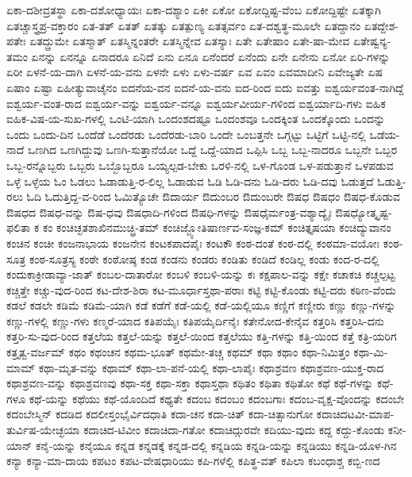 {ಏಕಾ-ದಶೀವ್ರತಸ್ಥಾ
ಏಕಾ-ದಶೋಧ್ಯಾಯಃ
ಏಕಾ-ದಶ್ಯಾಂ
ಏಕೀ
ಏಕೋ
ಏಕೋದ್ದಿಷ್ಟ-ವೆಂಬ
ಏಕೋದ್ದಿಷ್ಟೇ
ಏತಕ್ಕಾಗಿ
ಏತಚ್ಚಾಸ್ತ್ರಪ್ರ-ವಕ್ತಾರಂ
ಏತ-ತತ್
ಏತತ್
ಏತತ್ಕು
ಏತತ್ಪುಣ್ಯ
ಏತತ್ಸರ್ವಂ
ಏತ-ದಶ್ವತ್ಥ-ಮೂಲೇ
ಏತದ್ದಾನಂ
ಏತದ್ದೇಶ-ಪತೇಃ
ಏತದ್ದ್ರುಮೇ
ಏತಸ್ಮಾತ್
ಏತಸ್ಮಿನ್ನಂತರೇ
ಏತಸ್ಮಿನ್ನೇವ
ಏತಸ್ಯಾಃ
ಏತೇ
ಏತೇಷಾಂ
ಏತೇ-ಷಾ-ಮೇವ
ಏತೇಷ್ವನ್ಯ-ತಮಂ
ಏನನ್ನು
ಏನನ್ನೂ
ಏನಾದರೂ
ಏನಿದೆ
ಏನು
ಏನೂ
ಏನೆಂದರೆ
ಏನೆಂದು
ಏನೇ
ಏನೇನು
ಏನೋ
ಏರಿ-ಗಳನ್ನು
ಏರೀ
ಏಳನೆ-ಯ-ದಾಗಿ
ಏಳನೆ-ಯ-ವನು
ಏಳನೇ
ಏಳು
ಏಳು-ವರ್ಷ
ಏವ
ಏವಂ
ಏವಮಾದೀನಿ
ಏವೇಜ್ಯತೇ
ಏಷ
ಏಷಾಂ
ಏಷ್ಟಾ
ಏಹೀತ್ಯುವಾಚೈನಂ
ಐದನೆಯ-ವನ
ಐದನೆ-ಯ-ವನು
ಐದ-ರಿಂದ
ಐದು
ಐವತ್ತು
ಐಶ್ವರ್ಯವಂತ-ನಾಗಿದ್ದೆ
ಐಶ್ವರ್ಯ-ವಂತ-ರಾದ
ಐಶ್ವರ್ಯ-ವನ್ನು
ಐಶ್ವರ್ಯ-ವನ್ನೂ
ಐಶ್ವರ್ಯವೀರ್ಯ-ಗಳಿಂದ
ಐಶ್ವರ್ಯಾದಿ-ಗಳು
ಐಹಿಕ
ಐಹಿಕ-ವಿಷ-ಯ-ಸುಖ-ಗಳಲ್ಲಿ
ಒಂಟಿ-ಯಾಗಿ
ಒಂದಂಶದಷ್ಟೂ
ಒಂದಂಶವೂ
ಒಂದಕ್ಕಿಂತ
ಒಂದಕ್ಕೊಂದು
ಒಂದನ್ನು
ಒಂದು
ಒಂದು-ದಿನ
ಒಂದೆಡೆ
ಒಂದೆರಡು
ಒಂದೆರಡು-ಬಾರಿ
ಒಂದೇ
ಒಂಬತ್ತನೇ
ಒಗ್ಗಟ್ಟು
ಒಟ್ಟಿಗೆ
ಒಟ್ಟಿ-ನಲ್ಲಿ
ಒಡೆಯ-ನಾದೆ
ಒಣಗಿದ
ಒಣಗಿದ್ದುವು
ಒಣಗಿ-ಸುತ್ತಾನೆಯೋ
ಒದ್ದೆ
ಒದ್ದೆ-ಯಾದ
ಒಪ್ಪಿಸಿ
ಒಬ್ಬ
ಒಬ್ಬ-ನಾದರೂ
ಒಬ್ಬನೇ
ಒಬ್ಬರ
ಒಬ್ಬ-ರನ್ನೊಬ್ಬರು
ಒಬ್ಬರು
ಒಬ್ಬೊಬ್ಬರೂ
ಒಯ್ಯಲ್ಪಡ-ಬೇಕು
ಒರಳಿ-ನಲ್ಲಿ
ಒಳ-ಗೊಂಡ
ಒಳ-ಪಡುತ್ತಾನೆ
ಒಳಪಡುವ
ಒಳ್ಳೆ
ಒಳ್ಳೆಯ
ಓಂ
ಓಡಲು
ಓಡಾಡುತ್ತಿ-ರ-ಲಿಲ್ಲ
ಓಡಾಡುವ
ಓಡಿ
ಓಡಿ-ದನು
ಓಡಿ-ದರು
ಓಡಿ-ದವು
ಓಡುತ್ತದೆ
ಓಡುತ್ತಿ-ರಲು
ಓದಿ
ಓದುತ್ತಿದ್ದ-ವ-ರಿಂದ
ಓಮಿತ್ಯೊಚೇ
ಔದಾರ್ಯ
ಔದುಂಬರ
ಔದುಂಬರೇ
ಔಷಧ
ಔಷಧಂ
ಔಷಧ-ಕೊಡುವ
ಔಷಧದ
ಔಷಧ-ವನ್ನು
ಔಷ-ಧವು
ಔಷಧಾದಿ-ಗಳಿಂದ
ಔಷಧಿ-ಗಳನ್ನು
ಔಷಧೈರ್ಮಂತ್ರ-ವಶ್ಯಾದ್ಯೈಃ
ಔಷಧ್ಯೋತ್ಕೃಷ್ಟ-ಫಲಿತಾ
ಕ
ಕಂ
ಕಂಚಿಚ್ಛತಶಾಖಿನಮುಚ್ಛ್ರಿ-ತಮ್
ಕಂಚಿಜ್ಜ್ಯೋತಿಷಾರ್ಣವ-ಸಂಜ್ಞ-ಕಮ್
ಕಂಚಿತ್ತೃಷಯಾ
ಕಂಚಿದ್ಯುವಾನಂ
ಕಂಚಿನ
ಕಂಚೀ
ಕಂಜನಾಭಾಯ
ಕಂಜನೇನ
ಕಂಟಕಪಾದಪೈಃ
ಕಂಟಕೌ
ಕಂಠ-ದಂತೆ
ಕಂಠ-ದಲ್ಲಿ
ಕಂಠಮಾ-ವಯೋಃ
ಕಂಠ-ಸೂತ್ರ
ಕಂಠ-ಸೂತ್ರಸ್ಯ
ಕಂಠೇ
ಕಂಠೋಷ್ಠ
ಕಂಡ
ಕಂಡನು
ಕಂಡರು
ಕಂಡಿತು
ಕಂಡಿದೆ
ಕಂಡಿಲ್ಲ
ಕಂಡು
ಕಂದ-ರ-ದಲ್ಲಿ
ಕಂದುಕಾಕ್ರೀಡಾವ್ಯಾ-ಜಾತ್
ಕಂಬಲ-ದಾತಾರೋ
ಕಂಬಳಿ
ಕಂಬಳಿ-ಯನ್ನು
ಕಃ
ಕಕ್ಷಪಾಲ-ವನ್ನು
ಕಕ್ಷೇ
ಕಚಾಕಚಿ
ಕಚ್ಚಲ್ಪಟ್ಟ
ಕಚ್ಚಿತ್ತೇ
ಕಚ್ಚು-ವುದ-ರಿಂದ
ಕಟ-ದೇಶ-ಶಿರಾ
ಕಟ-ಮೂರ್ಧಾಸ್ತಥಾ-ಪರಾಃ
ಕಟ್ಟಿ
ಕಟ್ಟಿ-ಕೊಂಡು
ಕಟ್ಟಿ-ದರು
ಕಠಿಣ-ವೆಂದು
ಕಡಲೆ
ಕಡಲೇ
ಕಡಿಮೆ
ಕಡಿಮೆ-ಯಾಗಿ
ಕಡೆ
ಕಡೆಗೆ
ಕಡೆ-ಯಲ್ಲಿ
ಕಡೆ-ಯಲ್ಲಿಯೂ
ಕಣ್ಣಿಗೆ
ಕಣ್ಣೀರು
ಕಣ್ಣು
ಕಣ್ಣು-ಗಳನ್ನು
ಕಣ್ಣು-ಗಳಲ್ಲಿ
ಕಣ್ಣು-ಗಳು
ಕಣ್ಮರೆ-ಯಾದ
ಕತಿಪಯೈಃ
ಕತಿಪಯೈರ್ದಿನೈಃ
ಕತೇನೋದ-ಕೇನೈವ
ಕತ್ತರಿಸಿ
ಕತ್ತರಿಸಿ-ದನು
ಕತ್ತರಿ-ಸು-ವುದ-ರಿಂದ
ಕತ್ತಲೆಯ
ಕತ್ತಲೆ-ಯನ್ನು
ಕತ್ತಲೆ-ಯಿಂದ
ಕತ್ತಲೆಯು
ಕತ್ತಿ-ಗಳನ್ನು
ಕತ್ತಿ-ಯಿಂದ
ಕತ್ತೆ
ಕತ್ರಿ-ಯರಿಗ
ಕತ್ರೃತ್ವ-ವರ್ಜಮ್
ಕಥಂ
ಕಥಂಚನ
ಕಥಮ-ಭೂತ್
ಕಥಮೇ-ತಚ್ಚ
ಕಥಮ್
ಕಥಾ
ಕಥಾಂ
ಕಥಾ-ನಿಮಿತ್ತಂ
ಕಥಾ-ಮಿ-ಮಾಮ್
ಕಥಾ-ಮೃತ-ವನ್ನು
ಕಥಾಮ್
ಕಥಾ-ಲಾ-ಪನೆ-ಯಲ್ಲಿ
ಕಥಾ-ಲಾಪೈಃ
ಕಥಾಶ್ರವಣ
ಕಥಾಶ್ರವಣ-ಯುಕ್ತ-ರಾದ
ಕಥಾಶ್ರವಣ-ವನ್ನು
ಕಥಾಶ್ರವಣವು
ಕಥಾ-ಸಕ್ತ
ಕಥಾ-ಸಕ್ತಾ
ಕಥಾಸ್ತಥಾ
ಕಥಿತಂ
ಕಥಿತಾ
ಕಥಿತೋ
ಕಥೆ
ಕಥೆ-ಗಳನ್ನು
ಕಥೆ-ಗಳೂ
ಕಥೆ-ಯನ್ನು
ಕಥೆಯು
ಕಥೆ-ಯೊಂದಿದೆ
ಕಥ್ಯತೇ
ಕದಂಬ
ಕದಂಬಂ
ಕದಂಬಗಾಃ
ಕದಂಬ-ವೃಕ್ಷ-ವೊಂದನ್ನು
ಕದಂಬೇ
ಕದಂಬೇಸ್ಮಿನ್
ಕದಡಿದ
ಕದಲೀಸ್ತಂಭೈರ್ವಿದಧಾತಿ
ಕದಾ-ಚನ
ಕದಾ-ಚಿತ್
ಕದಾ-ಚಿತ್ಸಾನುಗೋ
ಕದಾಚಿದಟವೀ-ಮಾಪ-ತುರ್ವಿಷ-ಯೇಚ್ಛಯಾ
ಕದಾಚಿದ-ಟಿವೀಂ
ಕದಾಚಿದಾ-ಗತೋ
ಕದಾಚಿದ್ಗುರವೇ
ಕದಿಯು-ವುದು
ಕದ್ದ
ಕದ್ದು-ಕೊಂಡು
ಕನೀ-ಯಾನ್
ಕನೈ-ಯನ್ನು
ಕನೈಯೂ
ಕನ್ನಡ
ಕನ್ನಡಕ್ಕೆ
ಕನ್ನಡ-ದಲ್ಲಿ
ಕನ್ನಡಿಯ
ಕನ್ನಡಿ-ಯನ್ನು
ಕನ್ನಡಿಯು
ಕನ್ನಡಿ-ಯೊಳ-ಗಿನ
ಕನ್ಯಾ
ಕನ್ಯಾ-ಮಾ-ದಾಯ
ಕಪಟಂ
ಕಪಟ-ವೇಷಧಾರಿಯು
ಕಪಿ-ಗಳೆಲ್ಲಿ
ಕಪಿತ್ಥ-ವತ್
ಕಪಿಲಾ
ಕಬಂಧಾಶ್ಚ
ಕಬ್ಬಿ-ಣದ
}
